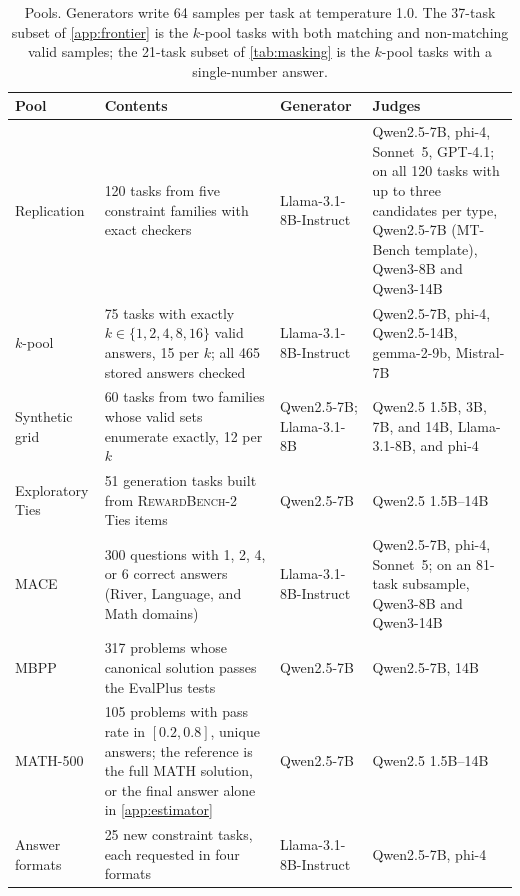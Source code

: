 \begin{table}[htbp]
\centering
\caption{Pools. Generators write 64 samples per task at temperature 1.0. The 37-task subset of \cref{app:frontier} is the $k$-pool tasks with both matching and non-matching valid samples; the 21-task subset of \cref{tab:masking} is the $k$-pool tasks with a single-number answer.}
\label{tab:pools}
\small
\setlength{\tabcolsep}{4pt}
\begin{tabular}{L{2.6cm}L{5.2cm}L{2.5cm}L{2.4cm}}
\toprule
Pool & Contents & Generator & Judges \\
\midrule
Replication\osf{} & 120 tasks from five constraint families with exact checkers & Llama-3.1-8B-Instruct & Qwen2.5-7B, phi-4, Sonnet~5, GPT-4.1; on all 120 tasks with up to three candidates per type, Qwen2.5-7B (MT-Bench template), Qwen3-8B and Qwen3-14B \\
$k$-pool\osf{} & 75 tasks with exactly $k \in \{1,2,4,8,16\}$ valid answers, 15 per $k$; all 465 stored answers checked & Llama-3.1-8B-Instruct & Qwen2.5-7B, phi-4, Qwen2.5-14B, gemma-2-9b, Mistral-7B \\
Synthetic grid\pre{} & 60 tasks from two families whose valid sets enumerate exactly, 12 per $k$ & Qwen2.5-7B; Llama-3.1-8B & Qwen2.5 1.5B, 3B, 7B, and 14B, Llama-3.1-8B, and phi-4 \\
Exploratory Ties & 51 generation tasks built from \textsc{RewardBench-2} Ties items & Qwen2.5-7B & Qwen2.5 1.5B--14B \\
\textsc{MACE}\pre{} & 300 questions with 1, 2, 4, or 6 correct answers (River, Language, and Math domains) & Llama-3.1-8B-Instruct & Qwen2.5-7B, phi-4, Sonnet~5; on an 81-task subsample, Qwen3-8B and Qwen3-14B \\
MBPP\pre{} & 317 problems whose canonical solution passes the EvalPlus tests~\citep{liu2023evalplus} & Qwen2.5-7B & Qwen2.5-7B, 14B \\
MATH-500 & 105 problems with pass rate in $[0.2, 0.8]$, unique answers; the reference is the full MATH solution, or the final answer alone in \cref{app:estimator} & Qwen2.5-7B & Qwen2.5 1.5B--14B \\
Answer formats\pre{} & 25 new constraint tasks, each requested in four formats & Llama-3.1-8B-Instruct & Qwen2.5-7B, phi-4 \\
\bottomrule
\end{tabular}

\end{table}

